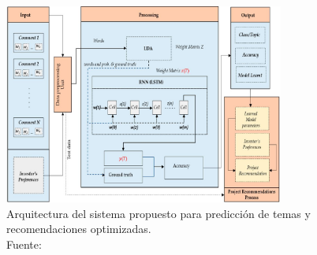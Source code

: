 \begin{figure}[!ht]
	\begin{center}
		\includegraphics[width=0.82\textwidth]{2/figures/shafqat2019.jpg}
		\caption[Arquitectura del sistema propuesto para predicción de temas y recomendaciones optimizadas]{Arquitectura del sistema propuesto para predicción de temas y recomendaciones optimizadas.\\
		Fuente: \cite{pr_shafqat2019topicpredictions}}
		\label{2:fig128}
	\end{center}
\end{figure}